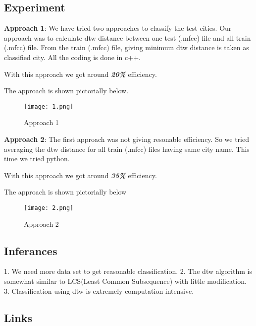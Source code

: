 \subsection{Experiment}
\begin{flushleft}
  \textbf{Approach 1}: \break
    We have tried two approaches to classify the test cities.
  Our approach was to calculate dtw distance between one test (.mfcc) file and all train (.mfcc) file.
  From the train (.mfcc) file, giving minimum dtw distance is taken as classified city. All the coding is done
  in c++.
  
  With this approach we got around \textbf{\textit{20\%}} efficiency.

  The approach is shown pictorially below.

\begin{figure}[!htb]
\begin{center}
  \texttt{[image: 1.png]}
  \caption{Approach 1}\label{fig:fig_a}
\endminipage\hfill
\end{center}
\end{figure}

\break

  \textbf{Approach 2}: \break
    The first approach was not giving resonable efficiency. So we tried averaging the dtw distance for all train (.mfcc) files having same city name. This time we tried python.
    
    With this approach we got around \textbf{\textit{35\%}} efficiency.

    The approach is shown pictorially below
\begin{figure}[!htb]
\begin{center}
  \texttt{[image: 2.png]}
  \caption{Approach 2}\label{fig:fig_a}
\endminipage\hfill
\end{center}
\end{figure}
\end{flushleft}

\subsection{Inferances}
\begin{flushleft}
  1. We need more data set to get reasonable classification.
  2. The dtw algorithm is somewhat similar to LCS(Least Common Subsequence) with little modification.
  3. Classification using dtw is extremely computation intensive.
\end{flushleft}

\subsection{Links}
